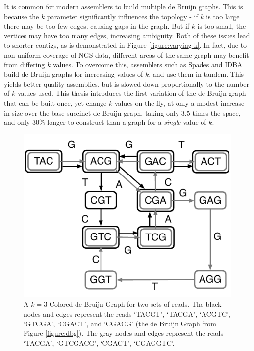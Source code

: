 It is common for modern assemblers to build multiple de Bruijn graphs. This is because the $k$ parameter significantly influences the topology - if $k$ is too large there may be too few edges, causing gaps in the graph. But if $k$ is too small, the vertices may have too many edges, increasing ambiguity. Both of these issues lead to shorter contigs, as is demonstrated in Figure \ref{figure:varying-k}. In fact, due to non-uniform coverage of NGS data, different areas of the same graph may benefit from differing $k$ values. To overcome this, assemblers such as Spades and IDBA~\cite{bankevich2012spades,peng2010idba} build de Bruijn graphs for increasing values of $k$, and use them in tandem. This yields better quality assemblies, but is slowed down proportionally to the number of $k$ values used. This thesis introduces the first variation of the de Bruijn graph that can be built once, yet change $k$ values on-the-fly, at only a modest increase in size over the base succinct de Bruijn graph, taking only $3.5$ times the space, and only $30\%$ longer to construct than a graph for a \emph{single} value of $k$.

\begin{figure}
	\begin{center}
		\includegraphics*[scale=0.8]{images/cdbg.pdf}
		\caption{A $k=3$ Colored de Bruijn Graph for two sets of reads. The black nodes and edges represent the reads `TACGT', `TACGA', `ACGTC', `GTCGA', `CGACT', and `CGACG' (the de Bruijn Graph from Figure \ref{figure:dbg}). The gray nodes and edges represent the reads `TACGA', `GTCGACG', `CGACT', `CGAGGTC'.}
		\label{figure:cdbg}
	\end{center}
\end{figure}

